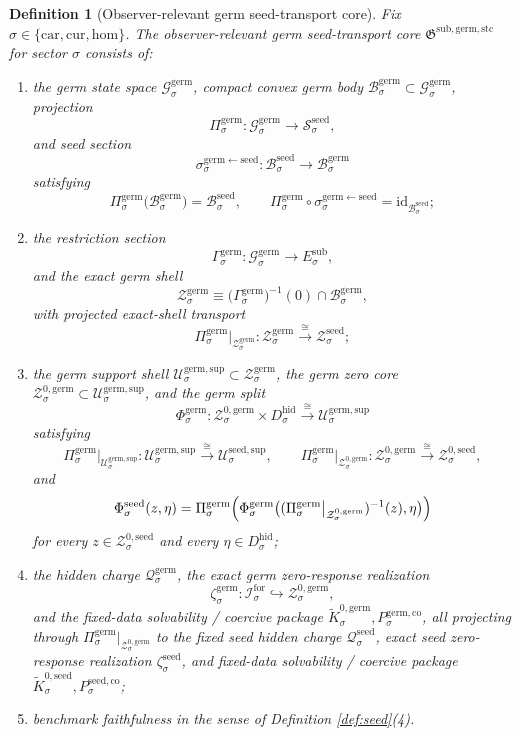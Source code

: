 \documentclass[11pt]{article}
\newcommand{\Car}{\mathrm{car}}
\newcommand{\Cur}{\mathrm{cur}}
\newcommand{\Hom}{\mathrm{hom}}
\newcommand{\ForSpace}[1]{\mathcal I_{#1}^{\mathrm{for}}}
\newcommand{\SubTarget}[1]{E_{#1}^{\mathrm{sub}}}
\newcommand{\HiddenBody}[1]{D_{#1}^{\mathrm{hid}}}
\newcommand{\SeedState}[1]{\mathcal S_{#1}^{\mathrm{seed}}}
\newcommand{\SeedBody}[1]{\mathcal B_{#1}^{\mathrm{seed}}}
\newcommand{\SeedShell}[1]{\mathcal Z_{#1}^{\mathrm{seed}}}
\newcommand{\SeedSupportShell}[1]{\mathcal U_{#1}^{\mathrm{seed,sup}}}
\newcommand{\SeedZeroCore}[1]{\mathcal Z_{#1}^{0,\mathrm{seed}}}
\newcommand{\SeedSplit}[1]{\Phi_{#1}^{\mathrm{seed}}}
\newcommand{\SeedCharge}[1]{\mathcal Q_{#1}^{\mathrm{seed}}}
\newcommand{\SeedEmbed}[1]{\zeta_{#1}^{\mathrm{seed}}}
\newcommand{\SeedKernel}[1]{\widetilde K_{#1}^{0,\mathrm{seed}}}
\newcommand{\SeedCoercive}[1]{P_{#1}^{\mathrm{seed,co}}}
\newcommand{\GermTransportCore}{\mathfrak G^{\mathrm{sub,germ,stc}}}
\newcommand{\GermState}[1]{\mathcal G_{#1}^{\mathrm{germ}}}
\newcommand{\GermBody}[1]{\mathcal B_{#1}^{\mathrm{germ}}}
\newcommand{\GermProj}[1]{\Pi_{#1}^{\mathrm{germ}}}
\newcommand{\GermSeedSec}[1]{\sigma_{#1}^{\mathrm{germ\leftarrow seed}}}
\newcommand{\GermSection}[1]{\Gamma_{#1}^{\mathrm{germ}}}
\newcommand{\GermShell}[1]{\mathcal Z_{#1}^{\mathrm{germ}}}
\newcommand{\GermSupportShell}[1]{\mathcal U_{#1}^{\mathrm{germ,sup}}}
\newcommand{\GermZeroCore}[1]{\mathcal Z_{#1}^{0,\mathrm{germ}}}
\newcommand{\GermSplit}[1]{\Phi_{#1}^{\mathrm{germ}}}
\newcommand{\GermCharge}[1]{\mathcal Q_{#1}^{\mathrm{germ}}}
\newcommand{\GermEmbed}[1]{\zeta_{#1}^{\mathrm{germ}}}
\newcommand{\GermKernel}[1]{\widetilde K_{#1}^{0,\mathrm{germ}}}
\newcommand{\GermCoercive}[1]{P_{#1}^{\mathrm{germ,co}}}
\newtheorem{definition}{Definition}
\begin{document}
\begin{definition}[Observer-relevant germ seed-transport core]
\label{def:core}
Fix \(\sigma\in\{\Car,\Cur,\Hom\}\). The \emph{observer-relevant germ seed-transport core} \(\GermTransportCore\) for sector \(\sigma\) consists of:
\begin{enumerate}
    \item the germ state space \(\GermState{\sigma}\), compact convex germ body \(\GermBody{\sigma}\subset\GermState{\sigma}\), projection
    \[
    \GermProj{\sigma}:\GermState{\sigma}\to\SeedState{\sigma},
    \]
    and seed section
    \[
    \GermSeedSec{\sigma}:\SeedBody{\sigma}\to\GermBody{\sigma}
    \]
    satisfying
    \[
    \GermProj{\sigma}\bigl(\GermBody{\sigma}\bigr)=\SeedBody{\sigma},
    \qquad
    \GermProj{\sigma}\circ\GermSeedSec{\sigma}
    =
    \mathrm{id}_{\SeedBody{\sigma}};
    \]
    \item the restriction section
    \[
    \GermSection{\sigma}:\GermState{\sigma}\to\SubTarget{\sigma},
    \]
    and the exact germ shell
    \[
    \GermShell{\sigma}
    \equiv
    \bigl(\GermSection{\sigma}\bigr)^{-1}(0)\cap\GermBody{\sigma},
    \]
    with projected exact-shell transport
    \[
    \GermProj{\sigma}\big|_{\GermShell{\sigma}}
    :
    \GermShell{\sigma}
    \xrightarrow{\cong}
    \SeedShell{\sigma};
    \]
    \item the germ support shell \(\GermSupportShell{\sigma}\subset\GermShell{\sigma}\), the germ zero core \(\GermZeroCore{\sigma}\subset\GermSupportShell{\sigma}\), and the germ split
    \[
    \GermSplit{\sigma}:
    \GermZeroCore{\sigma}\times\HiddenBody{\sigma}
    \xrightarrow{\cong}
    \GermSupportShell{\sigma}
    \]
    satisfying
    \[
    \GermProj{\sigma}\big|_{\GermSupportShell{\sigma}}
    :
    \GermSupportShell{\sigma}
    \xrightarrow{\cong}
    \SeedSupportShell{\sigma},
    \qquad
    \GermProj{\sigma}\big|_{\GermZeroCore{\sigma}}
    :
    \GermZeroCore{\sigma}
    \xrightarrow{\cong}
    \SeedZeroCore{\sigma},
    \]
    and
    \[
    \SeedSplit{\sigma}(z,\eta)
    =
    \GermProj{\sigma}\Bigl(
    \GermSplit{\sigma}\bigl(
    (\GermProj{\sigma}\big|_{\GermZeroCore{\sigma}})^{-1}(z),\eta
    \bigr)\Bigr)
    \]
    for every \(z\in\SeedZeroCore{\sigma}\) and every \(\eta\in\HiddenBody{\sigma}\);
    \item the hidden charge \(\GermCharge{\sigma}\), the exact germ zero-response realization
    \[
    \GermEmbed{\sigma}:\ForSpace{\sigma}\hookrightarrow\GermZeroCore{\sigma},
    \]
    and the fixed-data solvability / coercive package \(\GermKernel{\sigma},\GermCoercive{\sigma}\), all projecting through \(\GermProj{\sigma}\big|_{\GermZeroCore{\sigma}}\) to the fixed seed hidden charge \(\SeedCharge{\sigma}\), exact seed zero-response realization \(\SeedEmbed{\sigma}\), and fixed-data solvability / coercive package \(\SeedKernel{\sigma},\SeedCoercive{\sigma}\);
    \item benchmark faithfulness in the sense of Definition \ref{def:seed}(4).
\end{enumerate}
\end{definition}
\end{document}
